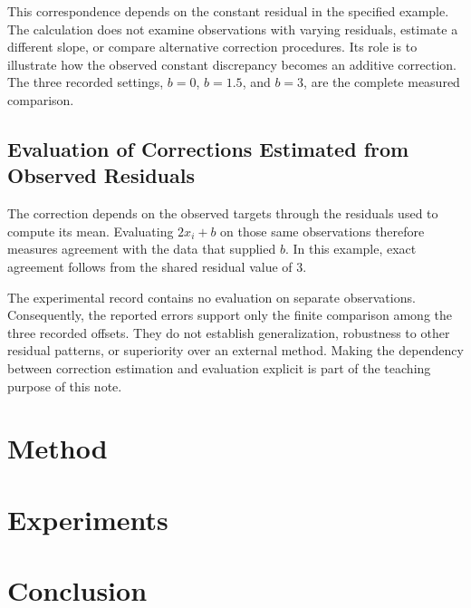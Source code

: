 \documentclass[11pt]{article}
\begin{document}
This correspondence depends on the constant residual in the specified example. The calculation does not examine observations with varying residuals, estimate a different slope, or compare alternative correction procedures. Its role is to illustrate how the observed constant discrepancy becomes an additive correction. The three recorded settings, $b=0$, $b=1.5$, and $b=3$, are the complete measured comparison.

\subsection{Evaluation of Corrections Estimated from Observed Residuals}
The correction depends on the observed targets through the residuals used to compute its mean. Evaluating $2x_i+b$ on those same observations therefore measures agreement with the data that supplied $b$. In this example, exact agreement follows from the shared residual value of $3$.

The experimental record contains no evaluation on separate observations. Consequently, the reported errors support only the finite comparison among the three recorded offsets. They do not establish generalization, robustness to other residual patterns, or superiority over an external method. Making the dependency between correction estimation and evaluation explicit is part of the teaching purpose of this note.
\section{Method}
\section{Experiments}
\section{Conclusion}


\end{document}
